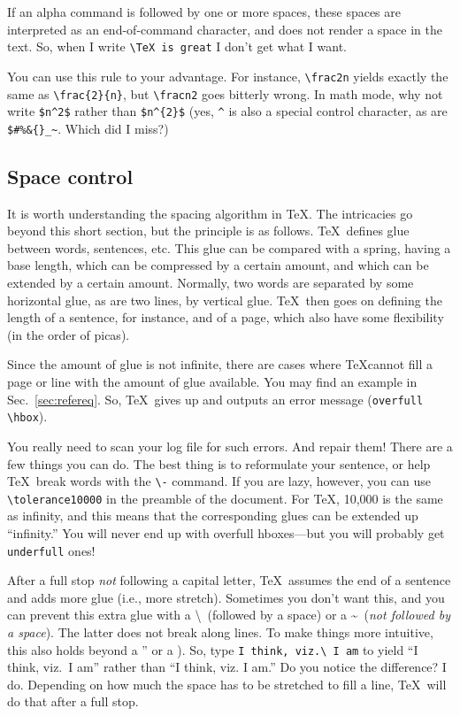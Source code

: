 \documentclass{article}
\begin{document}
If an alpha command is followed by one or more spaces, these spaces are interpreted as an end-of-command
character, and does not render a space in the text.  So, when I write \verb+\TeX is great+ I don't
get what I want.

You can use this rule to your advantage.  For instance, \verb+\frac2n+ yields exactly the
same as \verb+\frac{2}{n}+, but \verb+\fracn2+ goes bitterly wrong.  In math mode,
why not write \verb+$n^2$+ rather than \verb+$n^{2}$+ (yes, \verb+^+ is also a special
control character, as are \verb+$#%&{}_~+.  Which did I miss?)
 
\subsection{Space control}
It is worth understanding the spacing algorithm in \TeX. The intricacies go beyond this short section,
but the principle is as follows.  \TeX\ defines glue between words, sentences, etc.  This glue can
be compared with a spring, having a base length, which can be compressed by a certain amount,
and which can be extended by a certain amount.  Normally, two words are separated by some 
horizontal glue, as are two lines, by vertical glue.  \TeX\ then goes on defining the length of a sentence,
for instance, and of a page, which also have some flexibility (in the order of picas).

Since the amount of glue is not infinite, there are cases where \TeX cannot fill a page or line
with the amount of glue available.  You may find an example in Sec.~\ref{sec:refereq}.
So, \TeX\ gives up and outputs an error message (\verb+overfull \hbox+).

You really need to scan your log file for such errors.  And repair them!  There are a few things
you can do.  The best thing is to reformulate your sentence, or help \TeX\ break words
with the \verb+\-+ command.  If you are lazy, however, you can use \verb+\tolerance10000+
in the preamble of the document.  For \TeX, 10,000 is the same as infinity, and this means that
the corresponding glues can be extended up ``infinity.''  You will never end up with overfull
hboxes---but you will probably get \verb+underfull+ ones!

After a full stop \textsl{not} following a capital letter, \TeX\ assumes the end of a sentence
and adds more glue (i.e., more stretch).  Sometimes you don't want this, and you can prevent
this extra glue with a \textbackslash\ (followed by a space) or a \textasciitilde\ (\textsl{not followed by a space}).
The latter does not break along lines.
To make things more intuitive, this also holds beyond a '' or a ).  So, type
\verb+I think, viz.\ I am+
to yield ``I think, viz.\ I am''
rather than ``I think, viz. I am.''
Do you notice the difference?  I do.  Depending on how much the space has to be stretched to fill
a line, \TeX\ will do that after a full stop.
\end{document}
